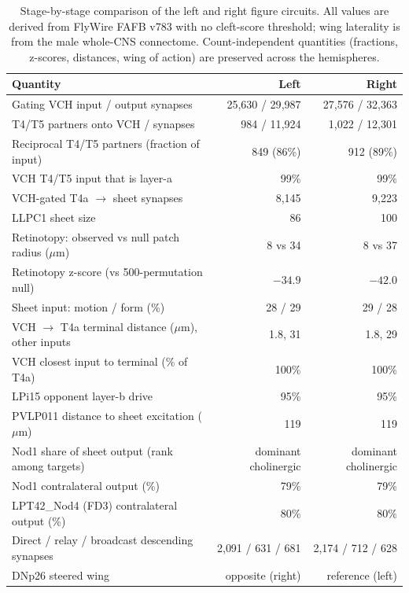 \documentclass[11pt]{article}
\begin{document}
\begin{table}[t]
\centering
\caption{Stage-by-stage comparison of the left and right figure circuits. All values are derived
from FlyWire FAFB v783 with no cleft-score threshold; wing laterality is from the male whole-CNS
connectome. Count-independent quantities (fractions, z-scores, distances, wing of action) are
preserved across the hemispheres.}
\label{tab:comparison}
\small
\begin{tabular}{@{}l r r@{}}
\toprule
Quantity & Left & Right \\
\midrule
Gating VCH input / output synapses & 25{,}630 / 29{,}987 & 27{,}576 / 32{,}363 \\
T4/T5 partners onto VCH / synapses & 984 / 11{,}924 & 1{,}022 / 12{,}301 \\
Reciprocal T4/T5 partners (fraction of input) & 849 (86\%) & 912 (89\%) \\
VCH T4/T5 input that is layer-a & 99\% & 99\% \\
VCH-gated T4a $\to$ sheet synapses & 8{,}145 & 9{,}223 \\
LLPC1 sheet size & 86 & 100 \\
Retinotopy: observed vs null patch radius ($\mu$m) & 8 vs 34 & 8 vs 37 \\
Retinotopy z-score (vs 500-permutation null) & $-34.9$ & $-42.0$ \\
Sheet input: motion / form (\%) & 28 / 29 & 29 / 28 \\
VCH $\to$ T4a terminal distance ($\mu$m), other inputs & 1.8, 31 & 1.8, 29 \\
VCH closest input to terminal (\% of T4a) & 100\% & 100\% \\
LPi15 opponent layer-b drive & 95\% & 95\% \\
PVLP011 distance to sheet excitation ($\mu$m) & 119 & 119 \\
Nod1 share of sheet output (rank among targets) & dominant cholinergic & dominant cholinergic \\
Nod1 contralateral output (\%) & 79\% & 79\% \\
LPT42\_Nod4 (FD3) contralateral output (\%) & 80\% & 80\% \\
Direct / relay / broadcast descending synapses & 2{,}091 / 631 / 681 & 2{,}174 / 712 / 628 \\
DNp26 steered wing & opposite (right) & reference (left) \\
\bottomrule
\end{tabular}
\end{table}
\end{document}

